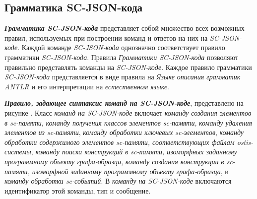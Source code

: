 \subsection{Грамматика SC-JSON-кода}
\label{sec_soft_platform_sc_json_code_grammar}

\textbf{\textit{Грамматика SC-JSON-кода}} представляет собой множество всех возможных правил, используемых при построении команд и ответов на них на \textit{SC-JSON-коде}. Каждой команде \textit{SC-JSON-кода} однозначно соответствует правило грамматики \textit{SC-JSON-кода}. Правила \textit{Грамматики SC-JSON-кода} позволяют правильно представлять команды на \textit{SC-JSON-коде}. Каждое правило грамматики \textit{SC-JSON-кода} представляется в виде правила на \textit{Языке описания грамматик ANTLR} и его интерпретации на \textit{естественном языке}.

\begin{SCn}
\begin{scnindent}
\end{scnindent}
\begin{scnindent}
\end{scnindent}
\begin{scnindent}
\end{scnindent}
\begin{scnindent}
\end{scnindent}
\end{SCn}

\textbf{\textit{Правило, задающее синтаксис \textit{команд на SC-JSON-коде}}}, представлено на рисунке . Класс \textit{команд на SC-JSON-коде} включает \textit{команду создания элементов в sc-памяти}, \textit{команду получения классов элементов sc-памяти}, \textit{команду удаления элементов из sc-памяти}, \textit{команду обработки ключевых sc-элементов}, \textit{команду обработки содержимого элементов sc-памяти, соответствующих файлам ostis-системы}, \textit{команду поиска конструкций в sc-памяти, изоморфных заданному программному объекту графа-образца}, \textit{команду создания конструкции в sc-памяти, изоморфной заданному программному объекту графа-образца}, и \textit{команду обработки sc-событий}. В \textit{команду на SC-JSON-коде} включаются идентификатор этой команды, тип и сообщение.

